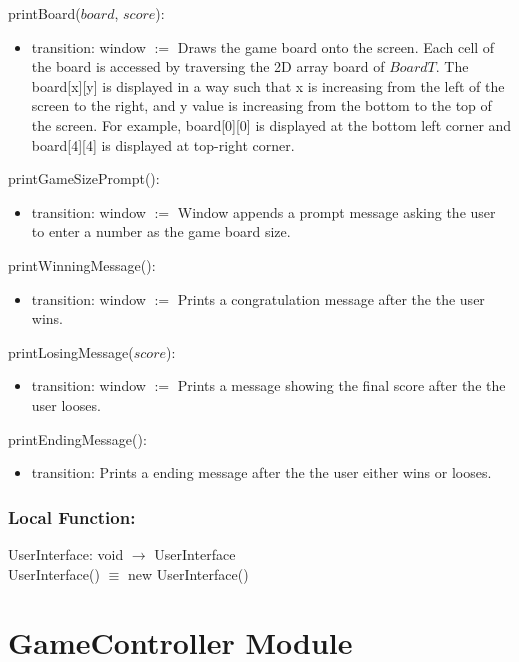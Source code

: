 \documentclass[12pt]{article}
\begin{document}
\noindent printBoard($board$, $score$):
\begin{itemize}
\item transition: window $:=$ Draws the game board onto the screen. Each cell of the board
                  is accessed by traversing the 2D array board of $BoardT$. The board[x][y] is displayed 
                  in a way such that x is increasing from the left of the screen to the right,
                  and y value is increasing from the bottom to the top of the screen. For example,
                  board[0][0] is displayed at the bottom left corner and board[4][4] is displayed 
                  at top-right corner. 
\end{itemize}

\noindent printGameSizePrompt():
\begin{itemize}
\item transition: window $:=$ Window appends a prompt message asking the user to enter a number as the game board size.
\end{itemize}

\noindent printWinningMessage():
\begin{itemize}
\item transition: window $:=$ Prints a congratulation message after the the user wins.
\end{itemize}

\noindent printLosingMessage($score$):
\begin{itemize}
\item transition: window $:=$ Prints a message showing the final score after the the user looses.
\end{itemize}

\noindent printEndingMessage():
\begin{itemize}
\item transition: Prints a ending message after the the user either wins or looses.
\end{itemize}

\subsubsection*{Local Function:}

UserInterface: void $\rightarrow$ UserInterface \\
UserInterface() $\equiv$ new UserInterface()

\newpage

\section* {GameController Module}
\end{document}
